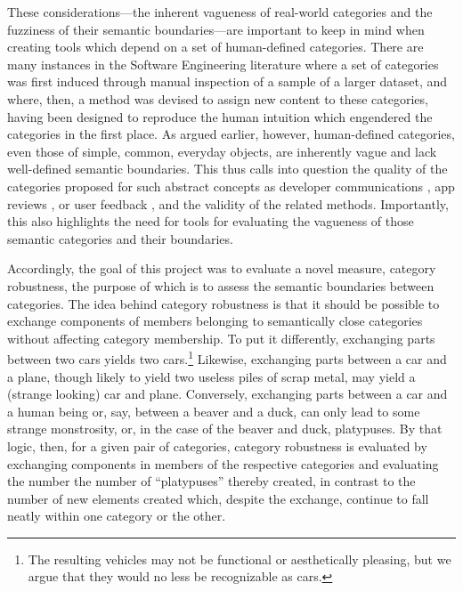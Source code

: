 \documentclass[letterpaper, 12 pt, conference]{ieeeconf}
\begin{document}
These considerations---the inherent vagueness of real-world categories and the fuzziness of their semantic boundaries---are important to keep in mind when creating tools which depend on a set of human-defined categories. There are many instances in the Software Engineering literature \cite{disorbo:deca:2016, guzzi:developer_communication:2012, guzzi:communication_in_mailing_lists:2013, huang:aim:2018,  DiSorbo:app_reviews:2016, gu:app_reviews:2015, maalej:bug_feature_praise:2015, palomba:app_reviews:2017, panichella:app_reviews:2015, villarroel:app_reviews:2016, pagano:user_feedback:2013} where a set of categories was first induced through manual inspection of a sample of a larger dataset, and where, then, a method was devised to assign new content to these categories, having been designed to reproduce the human intuition which engendered the categories in the first place.  As argued earlier, however, human-defined categories, even those of simple, common, everyday objects, are inherently vague and lack well-defined semantic boundaries. This thus calls into question the quality of the categories proposed for such abstract concepts as developer communications \cite{disorbo:deca:2016, guzzi:developer_communication:2012, guzzi:communication_in_mailing_lists:2013, huang:aim:2018}, app reviews \cite{DiSorbo:app_reviews:2016, gu:app_reviews:2015, maalej:bug_feature_praise:2015, palomba:app_reviews:2017, panichella:app_reviews:2015, villarroel:app_reviews:2016}, or user feedback \cite{pagano:user_feedback:2013}, and the validity of the related methods. Importantly, this also highlights the need for tools for evaluating the vagueness of those semantic categories and their boundaries.

Accordingly, the goal of this project was to evaluate a novel measure, category robustness, the purpose of which is to assess the semantic boundaries between categories. The idea behind category robustness is that it should be possible to exchange components of members belonging to semantically close categories without affecting category membership.  To put it differently, exchanging parts between two cars yields two cars.\footnote{The resulting vehicles may not be functional or aesthetically pleasing, but we argue that they would no less be recognizable as cars.} Likewise, exchanging parts between a car and a plane, though likely to yield two useless piles of scrap metal, may yield a (strange looking) car and plane. Conversely, exchanging parts between a car and a human being or, say, between a beaver and a duck, can only lead to some strange monstrosity, or, in the case of the beaver and duck, platypuses. By that logic, then, for a given pair of categories, category robustness is evaluated by exchanging components in members of the respective categories and evaluating the number the number of ``platypuses'' thereby created, in contrast to the number of new elements created which, despite the exchange, continue to fall neatly within one category or the other.
\end{document}
